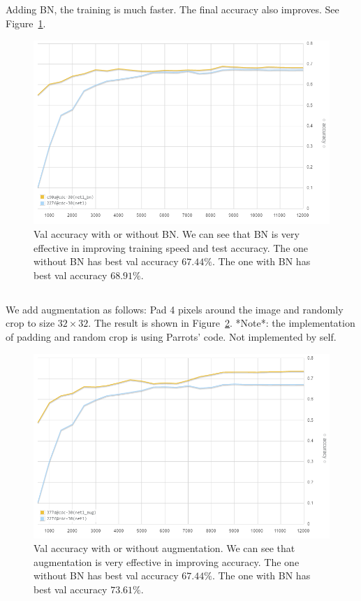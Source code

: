 \subsection{} %

Adding BN,
the training is much faster.
The final accuracy also improves.
See Figure~\ref{fig:bn}.

\begin{figure}[ht]
\centering
    \includegraphics[width=0.9\linewidth]{fig/bn}
    \caption{\small
    Val accuracy with or without BN.
    We can see that BN is very effective in improving
    training speed and test accuracy.
    The one without BN has best val accuracy $67.44\%$.
    The one with BN has best val accuracy $68.91\%$.}
    \label{fig:bn}
\end{figure}

\subsection{} %

We add augmentation as follows:
Pad 4 pixels around the image and randomly crop to size $32\times 32$.
The result is shown in Figure~\ref{fig:aug}.
*Note*: the implementation of padding and random crop
is using Parrots' code.
Not implemented by self.

\begin{figure}[ht]
\centering
    \includegraphics[width=0.9\linewidth]{fig/aug}
    \caption{\small
    Val accuracy with or without augmentation.
    We can see that augmentation is very effective in improving accuracy.
    The one without BN has best val accuracy $67.44\%$.
    The one with BN has best val accuracy $73.61\%$.}
    \label{fig:aug}
\end{figure}
